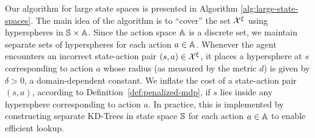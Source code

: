 

Our algorithm for  large state
spaces is presented in Algorithm \ref{alg:large-state-spaces}. The main idea
of the algorithm is to ``cover'' the set $\mathcal{X}^\xi$ using
hyperspheres in $\mathbb{S}\times\mathbb{A}$. Since the action
space $\mathbb{A}$ is a discrete set, we maintain separate sets of
hyperspheres for each action $a \in \mathbb{A}$. Whenever the agent encounters an incorrect
state-action pair $(s, a) \in \mathcal{X}^\xi$, it places a
hypersphere at $s$ corresponding to action $a$ whose radius (as
measured by the metric $d$) is given
by $\delta > 0$, a domain-dependent constant.
We inflate the cost of a
state-action pair $(s, a)$, according to
Definition~\ref{def:penalized-mdp},
if $s$ lies inside any hypersphere corresponding to action $a$. In
practice, this
is implemented by constructing 
separate KD-Trees in state space $\mathbb{S}$ for each action
$a \in \mathbb{A}$ to enable efficient lookup.


